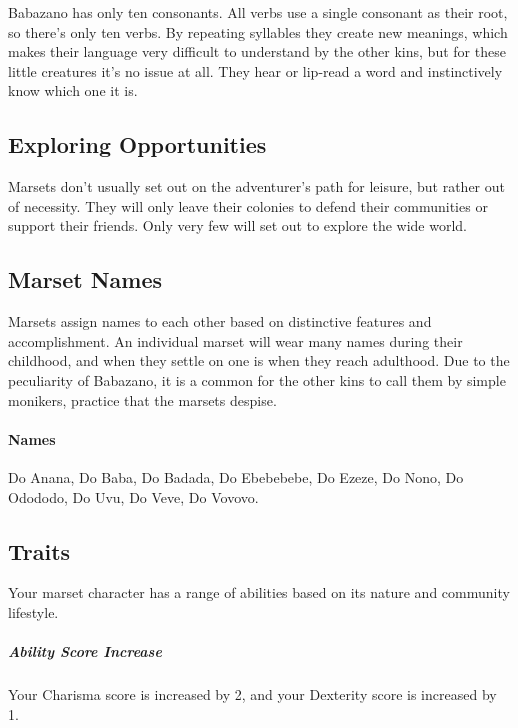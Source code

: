     Babazano has only ten consonants.
    All verbs use a single consonant as their root, so there's only ten verbs.
    By repeating syllables they create new meanings, which makes their language very difficult to understand by the other kins, but for these little creatures it's no issue at all.
    They hear or lip-read a word and instinctively know which one it is.

\subsection*{Exploring Opportunities}
    Marsets don't usually set out on the adventurer's path for leisure, but rather out of necessity.
    They will only leave their colonies to defend their communities or support their friends.
    Only very few will set out to explore the wide world.


\subsection*{Marset Names}
    Marsets assign names to each other based on distinctive features and accomplishment.
    An individual marset will wear many names during their childhood, and when they settle on one is when they reach adulthood.
    Due to the peculiarity of Babazano, it is a common for the other kins to call them by simple monikers, practice that the marsets despise.

    \paragraph{Names}
    Do Anana, Do Baba, Do Badada, Do Ebebebebe, Do Ezeze, Do Nono, Do Odododo, Do Uvu, Do Veve, Do Vovovo.

\subsection*{Traits}
    Your marset character has a range of abilities based on its nature and community lifestyle.

    \subparagraph{Ability Score Increase} Your Charisma score is increased by 2, and your Dexterity score is increased by 1.

